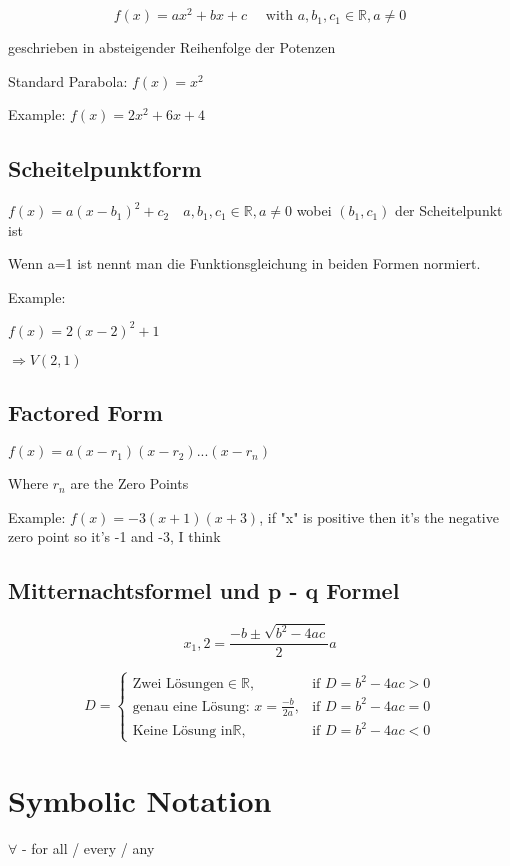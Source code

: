 \documentclass{article}
\begin{document}
$$f(x)=ax^2 + bx +c \quad \text{ with } a,b_1,c_1 \in \mathbb{R}, a \neq 0$$

geschrieben in absteigender Reihenfolge der Potenzen

Standard Parabola:
$f(x)=x^2$

Example:
$f(x)=2x^2+6x+4$

\subsection{Scheitelpunktform}

$f(x)=a(x-b_1)^2+c_2 \quad a,b_1,c_1 \in \mathbb{R}, a \neq 0$
wobei \( (b_1, c_1) \) der Scheitelpunkt ist


Wenn a=1 ist nennt man die Funktionsgleichung in beiden Formen normiert.

Example:

$f(x)=2(x-2)^2+1$

$\Rightarrow V(2, 1)$

\subsection{Factored Form}

$f(x)=a(x-r_1)(x-r_2)...(x-r_n)$

Where $r_n$ are the Zero Points

Example:
$f(x)=-3(x+1)(x+3)$, if "x" is positive then it's the negative zero point
so it's -1 and -3, I think

\subsection{Mitternachtsformel und p - q Formel}

$$x_1,2 = \frac{-b \pm \sqrt{b^2 - 4ac}}2a{}$$

\[
D =
\begin{cases} 
\text{Zwei Lösungen}\in\mathbb{R}, & \text{if } D=b^2 - 4ac > 0 \\
\text{genau eine Lösung: } x = \frac{-b}{2a}, & \text{if } D=b^2 - 4ac =0 \\
\text{Keine Lösung in} \mathbb{R}, & \text{if } D=b^2 - 4ac < 0 
\end{cases}
\]




\section{Symbolic Notation}
$\forall$ - for all / every / any
\end{document}
